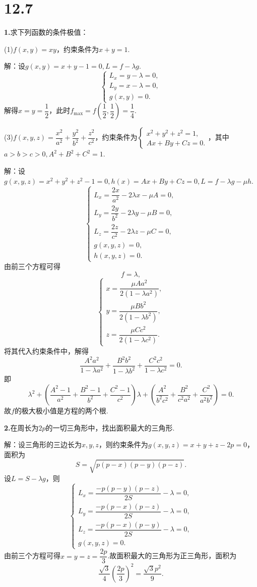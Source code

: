 \documentclass[12pt, a4paper]{article}
\begin{document}
\section*{12.7}
\textbf{1.}求下列函数的条件极值：

(1)\(f(x, y) = xy\)，约束条件为\(x + y = 1\).

解：设\(g(x, y) = x + y - 1 = 0, L = f - \lambda g.\)
\[\begin{cases}
L_x = y - \lambda = 0,\\
L_y = x - \lambda = 0,\\
g(x, y) = 0.
\end{cases}\]
解得\(x = y = \dfrac{1}{2}\)，此时\(f_{\text{max}} = f\left(\dfrac{1}{2}, \dfrac{1}{2}\right) = \dfrac{1}{4}\).

(3)\(f(x, y, z) = \dfrac{x^2}{a^2} + \dfrac{y^2}{b^2} + \dfrac{z^2}{c^2}\)，约束条件为\(\begin{cases}
x^2 + y^2 + z^2 = 1,\\
A x + B y + C z = 0.
\end{cases}\)，其中\(a > b > c > 0, A^2 + B^2 + C^2 = 1\).

解：设\(g(x, y, z) = x^2 + y^2 + z^2 - 1 = 0, h(x) = Ax + By + Cz = 0, L = f - \lambda g - \mu h.\)
\[\begin{cases}
L_x = \dfrac{2x}{a^2} - 2\lambda x - \mu A = 0,\\
L_y = \dfrac{2y}{b^2} - 2\lambda y - \mu B = 0,\\
L_z = \dfrac{2z}{c^2} - 2\lambda z - \mu C = 0,\\
g(x, y, z) = 0,\\
h(x, y, z) = 0.
\end{cases}\]
由前三个方程可得
\[f = \lambda,\]
\[\begin{cases}
x = \dfrac{\mu A a^2}{2(1 - \lambda a^2)},\\
y = \dfrac{\mu B b^2}{2(1 - \lambda b^2)},\\
z = \dfrac{\mu C c^2}{2(1 - \lambda c^2)}.
\end{cases}\]
将其代入约束条件中，解得
\[\dfrac{A^2 a^2}{1 - \lambda a^2} + \dfrac{B^2 b^2}{1 - \lambda b^2} + \dfrac{C^2 c^2}{1 - \lambda c^2} = 0.\]
即
\[\lambda^2 + \left(\frac{A^2 - 1}{a^2} + \frac{B^2 - 1}{b^2} + \frac{C^2 - 1}{c^2}\right)\lambda + \left(\frac{A^2}{b^2c^2} + \frac{B^2}{c^2a^2} + \frac{C^2}{a^2b^2}\right) = 0.\]
故\(f\)的极大极小值是方程的两个根.

\textbf{2.}在周长为\(2p\)的一切三角形中，找出面积最大的三角形.

解：设三角形的三边长为\(x, y, z\)，则约束条件为\(g(x, y, z) = x + y + z - 2p = 0\)，面积为
\[S = \sqrt{p(p - x)(p - y)(p - z)}.\]
设\(L = S - \lambda g\)，则
\[\begin{cases}
L_x = \dfrac{-p(p - y)(p - z)}{2S} - \lambda = 0,\\
L_y = \dfrac{-p(p - x)(p - z)}{2S} - \lambda = 0,\\
L_z = \dfrac{-p(p - x)(p - y)}{2S} - \lambda = 0,\\
g(x, y, z) = 0.
\end{cases}\]
由前三个方程可得\(x = y = z = \dfrac{2p}{3}\).故面积最大的三角形为正三角形，面积为
\[\frac{\sqrt{3}}{4}\left(\frac{2p}{3}\right)^2 = \frac{\sqrt{3}p^2}{9}.\]
\end{document}
